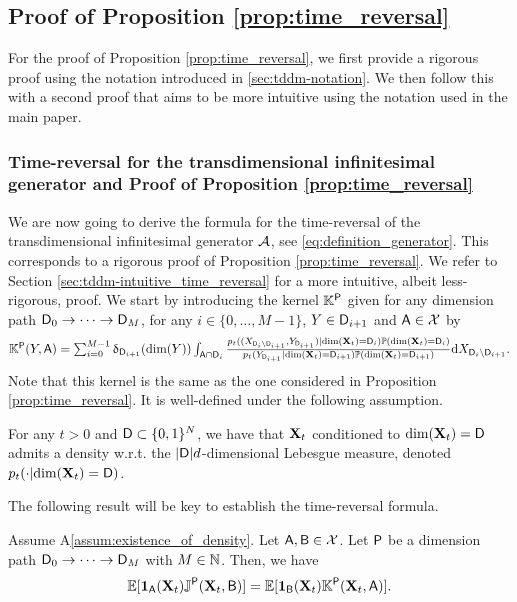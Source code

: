 \subsection{Proof of Proposition \ref{prop:time_reversal}}
For the proof of Proposition \ref{prop:time_reversal}, we first provide a rigorous proof using the notation introduced in \ref{sec:tddm-notation}. We then follow this with a second proof that aims to be more intuitive using the notation used in the main paper.

\subsubsection{Time-reversal for the transdimensional infinitesimal generator and Proof of Proposition \ref{prop:time_reversal}}
\label{sec:tddm-rigorousProofTimeReversal}

We are now going to derive the formula for the time-reversal of the
transdimensional infinitesimal generator ${\mathcal{A}}$, see
\eqref{eq:definition_generator}. This corresponds to a rigorous proof of
Proposition \ref{prop:time_reversal}. We refer to Section
\ref{sec:tddm-intuitive_time_reversal} for a more intuitive, albeit less-rigorous,
proof. We start by introducing the kernel $\mathbb{K}^{\mathsf{P}}$ given for any dimension
path $\mathsf{D}_0 \to \dots \to \mathsf{D}_M$, for any $i \in \{0, \dots, M-1\}$,
$Y \in \mathsf{D}_{i+1}$ and $\mathsf{A} \in \mathcal{X}$ by
\begin{equation}
  \textstyle \mathbb{K}^{\mathsf{P}}(Y, \mathsf{A}) = \sum_{i=0}^{M-1} \updelta_{\mathsf{D}_{i+1}}(\mathrm{dim}(Y)) \int_{\mathsf{A} \cap \mathsf{D}_i} \tfrac{p_t((X_{\mathsf{D}_i \backslash \mathsf{D}_{i+1}}, Y_{\mathsf{D}_{i+1}})|\mathrm{dim}(\mathbf{X}_t)=\mathsf{D}_i)\mathbb{P}(\mathrm{dim}(\mathbf{X}_t)=\mathsf{D}_i)}{p_t(Y_{\mathsf{D}_{i+1}}|\mathrm{dim}(\mathbf{X}_t)=\mathsf{D}_{i+1})\mathbb{P}(\mathrm{dim}(\mathbf{X}_t)=\mathsf{D}_{i+1})} \mathrm{d} X_{\mathsf{D}_i \backslash \mathsf{D}_{i+1}} . 
\end{equation}
Note that this kernel is the same as the one considered in Proposition
\ref{prop:time_reversal}. It is well-defined under the following assumption.

\begin{assumption}
  \label{assum:existence_of_density}
  For any $t > 0$ and $\mathsf{D} \subset \{0,1\}^N$, we have that $\mathbf{X}_t$
  conditioned to $\mathrm{dim}(\mathbf{X}_t) = \mathsf{D}$ admits a density w.r.t. the
  $|\mathsf{D}|d$-dimensional Lebesgue measure, denoted
  $p_t(\cdot | \mathrm{dim}(\mathbf{X}_t) = \mathsf{D})$. 
\end{assumption}

The following result will be key to establish the time-reversal formula.

\begin{lemma}
  \label{lemma:flux_equation}
  Assume \textup{A\ref{assum:existence_of_density}}. Let $\mathsf{A}, \mathsf{B} \in \mathcal{X}$. Let
  $\mathsf{P}$ be a dimension path $\mathsf{D}_0 \to \dots \to \mathsf{D}_M$ with $M \in \mathbb{N}$.
  Then, we have
  \begin{equation}
    \mathbb{E}[\mathbf{1}_{\mathsf{A}}(\mathbf{X}_t) \mathbb{J}^{\mathsf{P}}(\mathbf{X}_t, \mathsf{B})] = \mathbb{E}[\mathbf{1}_{\mathsf{B}}(\mathbf{X}_t) \mathbb{K}^{\mathsf{P}}(\mathbf{X}_t, \mathsf{A})] . 
  \end{equation}
\end{lemma}

